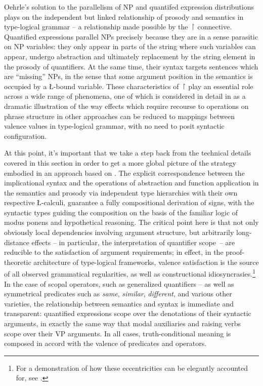 \documentclass[output=paper,colorlinks,citecolor=brown]{langscibook}
\begin{document}
Oehrle's solution to the parallelism of NP and quantifed expression
distributions plays on the independent but linked relationship of
prosody and semantics in type-logical grammar -- a relationship made
possible by the \ensuremath{\vs} connective. Quantified expressions parallel NPs
precisely because they are in a sense parasitic on NP variables: they
only appear in parts of the string where such variables can appear,
undergo abstraction and ultimately replacement by the string element
in the prosody of quantifiers. At the same time, their syntax targets
sentences which are ``missing'' NPs, in the sense that some argument
position in the semantics is occupied by a \L-bound variable. These
characteristics of \ensuremath{\vs} play an essential role across a wide range of
phenomena, one of which is considered in detail in  as
a dramatic illustration of the way effects which require recourse to
operations on phrase structure in other approaches can be reduced to
mappings between valence values in type-logical grammar, with no need
to posit syntactic configuration.\largerpage



At this point, it's important that we take a step back from the
technical details covered in this section in order to get a more
global picture of the strategy embodied in an approach based on
. The explicit correspondence between the implicational syntax
and the operations of abstraction and function application in the
semantics and prosody via independent type hierarchies with their own
respective \L-calculi, guarantee a fully compositional derivation of
signs, with the syntactic types guiding the composition on the basis
of the familiar logic of modus ponens and hypothetical reasoning. The
critical point here is that not only obviously local dependencies
involving argument structure, but arbitrarily long-distance
effects -- in particular, the interpretation of quantifier scope~-- are
reducible to the satisfaction of argument requirements; in effect, in
the proof-theoretic architecture of type-logical frameworks, valence
satisfaction is the source of all observed grammatical regularities,
as well as constructional idiosyncrasies.{\footnote{For
a demonstration of how these eccentricities can be elegantly accounted
for, see \citet{kubota-levine2022a}.}} In the case of scopal operators, such
as generalized quantifiers -- as well as symmetrical predicates such as
\textit{same}, \textit{similar}, \textit{different}, and various other varieties, the
relationship between semantics and syntax is immediate and
transparent: quantified expressions scope over the denotations of
their syntactic arguments, in exactly the same way that modal
auxiliaries and raising verbs scope over their VP arguments. In all
cases, truth-conditional meaning is composed in accord with the
valence of predicates and operators.
\end{document}
